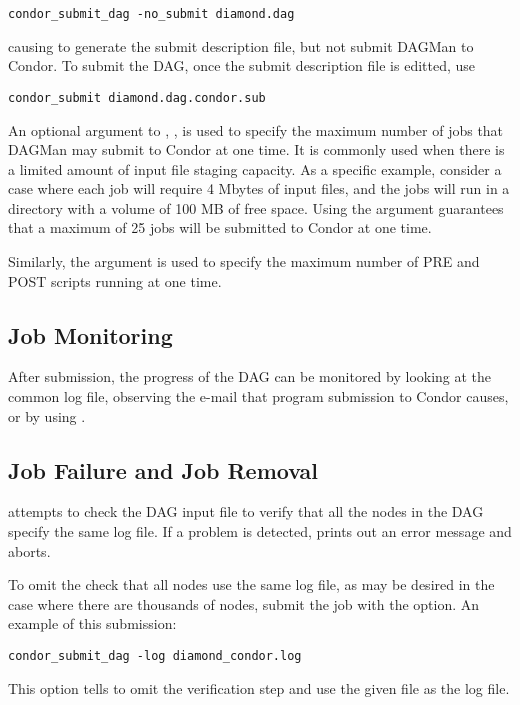 \begin{verbatim}
condor_submit_dag -no_submit diamond.dag
\end{verbatim}
causing  to generate the submit description file,
but not submit DAGMan to Condor.
To submit the DAG, once the submit description file is editted,
use

\begin{verbatim}
condor_submit diamond.dag.condor.sub
\end{verbatim}

An optional argument to , , 
is used to specify the maximum number of jobs that DAGMan may
submit to Condor at one time.
It is commonly used when 
there is a limited amount of input file staging capacity.
As a specific example, consider a case where each job will
require 4 Mbytes of input files,
and the jobs will run in a directory with a volume of 100 MB of free space.
Using the argument  guarantees that a maximum
of 25 jobs will be submitted to Condor at one time.

Similarly, the  argument is used to specify the
maximum number of PRE and POST scripts running at one time.

\subsection{Job Monitoring}

After submission, the progress of the DAG can be monitored
by looking at the common log file,
observing the e-mail that program submission to Condor causes,
or by using  .

\subsection{Job Failure and Job Removal}

 attempts to check the DAG input file
to verify that all the nodes in the DAG
specify the same log file.
If a problem is detected,
 prints out an error message and aborts.

To omit the check that all nodes use the same log file,
as may be desired in the case where there are thousands of nodes,
submit the job with the  option.
An example of this submission:
\begin{verbatim}
condor_submit_dag -log diamond_condor.log
\end{verbatim}
This option tells  to omit the verification
step and use the given file as the log file.

